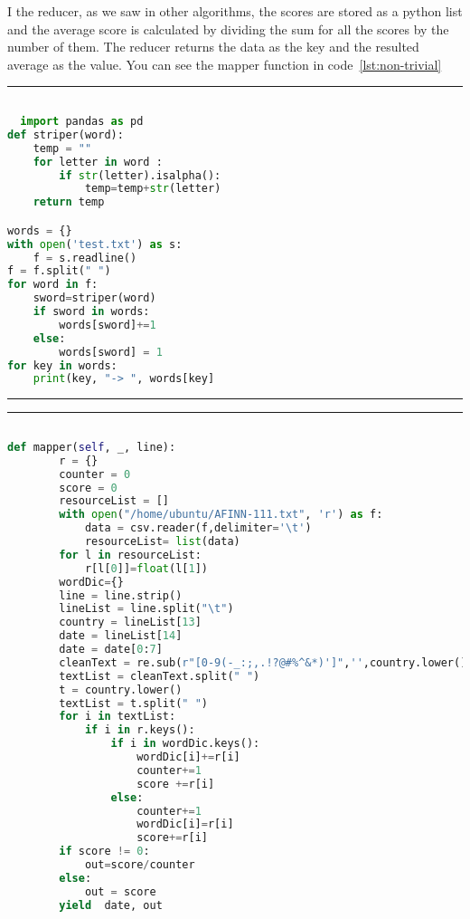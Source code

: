 I the reducer, as we saw in other algorithms, the scores are stored as a python list and the average score is calculated by dividing the sum for all the scores by the number of them. The reducer returns the data as the key and the resulted average as the value. You can see the mapper function in code~\ref{lst:non-trivial} 


\rule{200 pt}{0.5 pt} 

\renewcommand{\lstlistingname}{Code}
\lstset{style=mystyle}
\begin{lstlisting}[language=Python, caption={A simple tokenization algorithm in Python}, label={lst:tokenizer}, mathescape = true, breaklines=true]

  import pandas as pd
def striper(word):
    temp = ""
    for letter in word :
        if str(letter).isalpha():
            temp=temp+str(letter)
    return temp

words = {}
with open('test.txt') as s:
    f = s.readline()
f = f.split(" ")
for word in f:
    sword=striper(word)
    if sword in words:
        words[sword]+=1
    else:
        words[sword] = 1
for key in words:
    print(key, "-> ", words[key]
\end{lstlisting}

\rule{200 pt}{0.5 pt}




\rule{200 pt}{0.5 pt} 

\renewcommand{\lstlistingname}{Code}
\lstset{style=mystyle}
\begin{lstlisting}[language=Python, caption={Sentiment analysis non-trivial algorithm}, label={lst:non-trivial}, mathescape = true, breaklines=true]

def mapper(self, _, line):
        r = {}
        counter = 0
        score = 0
        resourceList = []
        with open("/home/ubuntu/AFINN-111.txt", 'r') as f:
            data = csv.reader(f,delimiter='\t')
            resourceList= list(data)
        for l in resourceList:
            r[l[0]]=float(l[1])
        wordDic={}
        line = line.strip() 
        lineList = line.split("\t")
        country = lineList[13]
        date = lineList[14]
        date = date[0:7]
        cleanText = re.sub(r"[0-9(-_:;,.!?@#%^&*)']",'',country.lower())
        textList = cleanText.split(" ")
        t = country.lower()
        textList = t.split(" ")
        for i in textList:
            if i in r.keys():
                if i in wordDic.keys():
                    wordDic[i]+=r[i]
                    counter+=1
                    score +=r[i]
                else:
                    counter+=1
                    wordDic[i]=r[i]
                    score+=r[i]
        if score != 0:
            out=score/counter
        else:
            out = score
        yield  date, out


\end{lstlisting}

